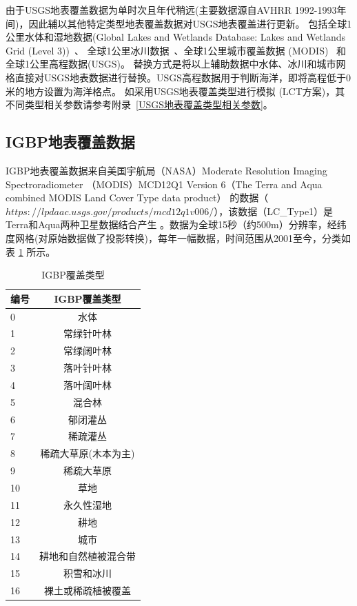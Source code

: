 由于USGS地表覆盖数据为单时次且年代稍远(主要数据源自AVHRR 1992-1993年间)，因此辅以其他特定类型地表覆盖数据对USGS地表覆盖进行更新。
包括全球1公里水体和湿地数据(Global Lakes and Wetlands Database: Lakes and Wetlands Grid (Level 3))~\citep{lehner2004development}、
全球1公里冰川数据~\citep{RGIConsortium2017}、全球1公里城市覆盖数据 (MODIS)~\citep{schneider2009new} 和全球1公里高程数据(USGS)。
替换方式是将以上辅助数据中水体、冰川和城市网格直接对USGS地表数据进行替换。USGS高程数据用于判断海洋，即将高程低于0米的地方设置为海洋格点。
如采用USGS地表覆盖类型进行模拟 (LCT方案)，其不同类型相关参数请参考附录~\ref{USGS地表覆盖类型相关参数}。

\subsection{IGBP地表覆盖数据}\label{IGBP地表覆盖数据}
IGBP地表覆盖数据来自美国宇航局（NASA）Moderate Resolution Imaging Spectroradiometer 
（MODIS）MCD12Q1 Version 6（The Terra and Aqua combined MODIS Land Cover Type data product）
的数据（$https://lpdaac.usgs.gov/products/mcd12q1v006/$），该数据（LC\_Type1）是Terra和Aqua两种卫星数据结合产生 
 \citep{Friedl2019}。数据为全球15秒（约500m）分辨率，经纬度网格(对原始数据做了投影转换)，每年一幅数据，时间范围从2001至今，分类如表 \ref{tab:IGBP覆盖类型} 所示。

\begin{table}[]
\centering
\caption{IGBP覆盖类型}
\label{tab:IGBP覆盖类型}
\begin{tabular}{@{}lc@{}}
\toprule
编号 & IGBP覆盖类型     \\ \midrule
0  & 水体           \\
1  & 常绿针叶林           \\
2  & 常绿阔叶林      \\
3  & 落叶针叶林     \\
4  & 落叶阔叶林 \\
5  & 混合林     \\
6  & 郁闭灌丛      \\
7  & 稀疏灌丛           \\
8  & 稀疏大草原(木本为主)         \\
9  & 稀疏大草原     \\
10 & 草地         \\
11 & 永久性湿地        \\
12 & 耕地        \\
13 & 城市        \\
14 & 耕地和自然植被混合带        \\
15 & 积雪和冰川        \\
16 & 裸土或稀疏植被覆盖       \\ \bottomrule
\end{tabular}
\end{table}


